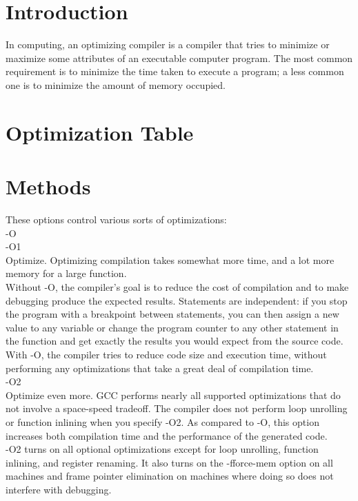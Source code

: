 \documentclass{sem5}
\author{Hemant Kumar}
\begin{document}
\section*{Introduction}
In computing, an optimizing compiler is a compiler that tries to minimize or maximize some attributes of an executable computer program. The most common requirement is to minimize the time taken to execute a program; a less common one is to minimize the amount of memory occupied.

\section*{Optimization Table}



\section*{Methods}
These options control various sorts of optimizations:\\
-O\\
-O1\\
Optimize. Optimizing compilation takes somewhat more time, and a lot more memory for a large function.\\
Without -O, the compiler's goal is to reduce the cost of compilation and to make debugging produce the expected results. Statements are independent: if you stop the program with a breakpoint between statements, you can then assign a new value to any variable or change the program counter to any other statement in the function and get exactly the results you would expect from the source code.\\

With -O, the compiler tries to reduce code size and execution time, without performing any optimizations that take a great deal of compilation time. \\

-O2\\
Optimize even more. GCC performs nearly all supported optimizations that do not involve a space-speed tradeoff. The compiler does not perform loop unrolling or function inlining when you specify -O2. As compared to -O, this option increases both compilation time and the performance of the generated code.\\
-O2 turns on all optional optimizations except for loop unrolling, function inlining, and register renaming. It also turns on the -fforce-mem option on all machines and frame pointer elimination on machines where doing so does not interfere with debugging.\\
\end{document}
